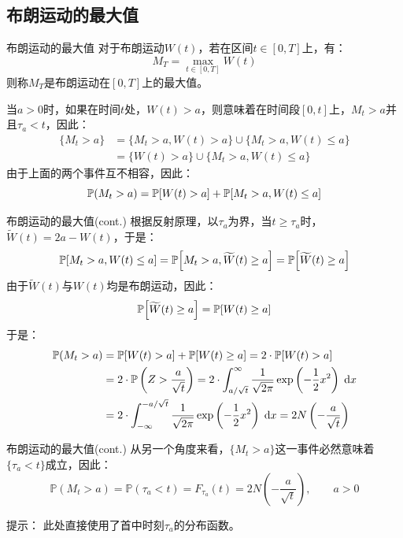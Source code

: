 \documentclass[t]{beamer}
\newcommand{\dif}{{\;\rm d}}
\renewcommand{\Pr}{\mathbb{P}}
\begin{document}
\subsection{布朗运动的最大值}
\begin{frame}{布朗运动的最大值}
  对于布朗运动$W(t)$，若在区间$t\in[0,T]$上，有：
  $$M_T=\max_{t\in [0,T]}W(t)$$
    则称$M_T$是布朗运动在$[0,T]$上的最大值。

    当$a>0$时，如果在时间$t$处，$W(t)>a$，则意味着在时间段$[0,t]$上，$M_t>a$并且$\tau_a<t$，因此：
\begin{equation*}
\begin{split}
\{M_t>a\}&=\{M_t>a,W(t)>a\}\cup\{M_t>a, W(t)\le a\}\\
&=\{W(t)>a\}\cup\{M_t>a, W(t)\le a\}
\end{split}
\end{equation*}
由于上面的两个事件互不相容，因此：
\begin{equation*}
\Pr(M_t>a)=\Pr\qty[W(t)>a]+\Pr\qty[M_t>a, W(t)\le a]
\end{equation*}
\end{frame}


\begin{frame}{布朗运动的最大值(cont.)}
  根据反射原理，以$\tau_a$为界，当$t\ge \tau_a$时，$\widetilde{W}(t)=2a-W(t)$，于是：
  \begin{equation*}
  \Pr\qty[M_t>a, W(t)\le a]=\Pr\qty[M_t>a,\widetilde W(t)\ge a]=\Pr\qty[\widetilde W(t)\ge a]
  \end{equation*}
  由于$\widetilde W(t)$与$W(t)$均是布朗运动，因此：
  \[\Pr\qty[\widetilde W(t)\ge a]=\Pr\qty[W(t)\ge a] \]
  于是：
  \begin{equation*}
  \begin{split}
  \Pr(M_t>a)&=\Pr\qty[W(t)>a]+\Pr\qty[W(t)\ge a]=2\cdot\Pr\qty[W(t)> a]\\
  &=2\cdot \Pr\left(Z>\frac{a}{\sqrt{t}}\right)=2\cdot \int_{a/\sqrt{t}}^{\infty} \frac{1}{\sqrt{2\pi}}\exp\left(-\frac{1}{2}x^2\right)\dif x \\
  &=2\cdot \int^{-a/\sqrt{t}}_{-\infty} \frac{1}{\sqrt{2\pi}}\exp\left(-\frac{1}{2}x^2\right)\dif x=2N\left( -\frac{a}{\sqrt{t}}\right) 
  \end{split}
  \end{equation*}
\end{frame}


\begin{frame}{布朗运动的最大值(cont.)}
    从另一个角度来看，$\{M_t>a\}$这一事件必然意味着$\{\tau_a<t\}$成立，因此：
    \begin{equation*}
    \Pr(M_t>a)=\Pr(\tau_a<t)=F_{\tau_a}(t)=2N\left( -\frac{a}{\sqrt{t}}\right) ,\qquad a>0
    \end{equation*}

    \begin{block}{提示：}
      此处直接使用了首中时刻$\tau_a$的分布函数。
    \end{block}
\end{frame}
\end{document}

